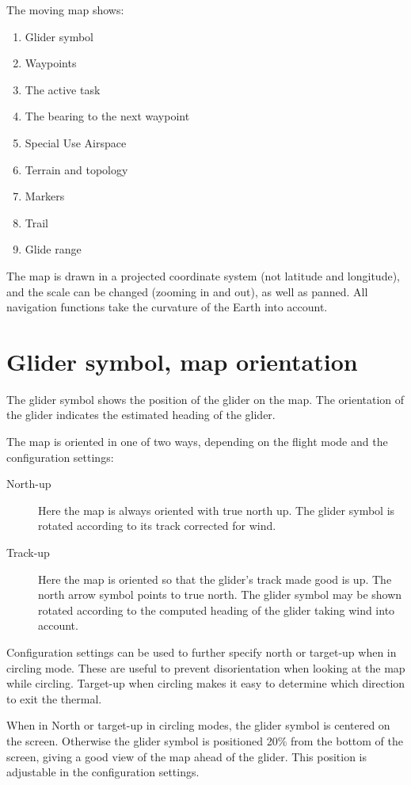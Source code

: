 \documentclass[a4paper,12pt]{refrep}
\begin{document}
The moving map shows:
\begin{enumerate} 
\item Glider symbol
\item Waypoints
\item The active task
\item The bearing to the next waypoint
\item Special Use Airspace
\item Terrain and topology
\item Markers
\item Trail
\item Glide range
\end{enumerate}
The map is drawn in a projected coordinate system (not latitude and
longitude), and the scale can be changed (zooming in and out), as well
as panned.  All navigation functions take the curvature of the Earth
into account.

\section{Glider symbol, map orientation}
The glider symbol shows the position of the glider on the map.  The
orientation of the glider indicates the estimated heading of the
glider.

The map is oriented in one of two ways, depending on the flight mode
and the configuration settings:
\begin{description}
\item[North-up]  Here the map is always oriented with true north up.
  The glider symbol is rotated according to its track corrected for wind.
\item[Track-up]  Here the map is oriented so that the glider's track
  made good is up.  The north arrow symbol points to true north.  
  The glider symbol may be shown rotated according to the computed
  heading of the glider taking wind into account.
\end{description}

Configuration settings can be used to further specify north or
target-up when in circling mode.  These are useful to prevent
disorientation when looking at the map while circling.  Target-up when
circling makes it easy to determine which direction to exit the
thermal.

When in North or target-up in circling modes, the glider symbol is
centered on the screen.  Otherwise the glider symbol is positioned
20\% from the bottom of the screen, giving a good view of the map
ahead of the glider.  This position is adjustable in the configuration
settings.
\end{document}
